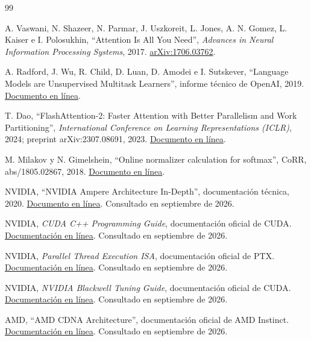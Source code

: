 \begin{thebibliography}{99}

A. Vaswani, N. Shazeer, N. Parmar, J. Uszkoreit, L. Jones, A. N. Gomez, L. Kaiser e I. Polosukhin,
``Attention Is All You Need'',
\textit{Advances in Neural Information Processing Systems}, 2017.
\href{https://arxiv.org/abs/1706.03762}{arXiv:1706.03762}.

A. Radford, J. Wu, R. Child, D. Luan, D. Amodei e I. Sutskever,
``Language Models are Unsupervised Multitask Learners'',
informe técnico de OpenAI, 2019.
\href{https://cdn.openai.com/better-language-models/language_models_are_unsupervised_multitask_learners.pdf}{Documento en línea}.

T. Dao,
``FlashAttention-2: Faster Attention with Better Parallelism and Work Partitioning'',
\textit{International Conference on Learning Representations (ICLR)}, 2024; preprint arXiv:2307.08691, 2023.
\href{https://arxiv.org/abs/2307.08691}{Documento en línea}.

M. Milakov y N. Gimelshein,
``Online normalizer calculation for softmax'',
CoRR, abs/1805.02867, 2018.
\href{https://arxiv.org/abs/1805.02867}{Documento en línea}.

NVIDIA,
``NVIDIA Ampere Architecture In-Depth'',
documentación técnica, 2020.
\href{https://developer.nvidia.com/blog/nvidia-ampere-architecture-in-depth/}{Documento en línea}.
Consultado en septiembre de 2026.

NVIDIA,
\textit{CUDA C++ Programming Guide}, documentación oficial de CUDA.
\href{https://docs.nvidia.com/cuda/cuda-c-programming-guide/}{Documentación en línea}.
Consultado en septiembre de 2026.

NVIDIA,
\textit{Parallel Thread Execution ISA}, documentación oficial de PTX.
\href{https://docs.nvidia.com/cuda/parallel-thread-execution/}{Documentación en línea}.
Consultado en septiembre de 2026.

NVIDIA,
\textit{NVIDIA Blackwell Tuning Guide}, documentación oficial de CUDA.
\href{https://docs.nvidia.com/cuda/blackwell-tuning-guide/}{Documentación en línea}.
Consultado en septiembre de 2026.

AMD,
``AMD CDNA Architecture'', documentación oficial de AMD Instinct.
\href{https://www.amd.com/en/technologies/cdna.html}{Documentación en línea}.
Consultado en septiembre de 2026.


\end{thebibliography}
